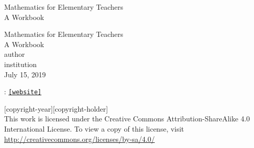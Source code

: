 \documentclass[twoside,11pt,]{book}
\newcommand{\mono}[1]{\texttt{#1}}
\begin{document}
\frontmatter
\thispagestyle{empty}
{\centering
\vspace*{0.28\textheight}
{\Huge Mathematics for Elementary Teachers}\\[2\baselineskip]
{\LARGE A Workbook}\\
}
\clearpage
\thispagestyle{empty}
\null%
\clearpage
\thispagestyle{empty}
{\centering
\vspace*{0.14\textheight}
{\Huge Mathematics for Elementary Teachers}\\[\baselineskip]
{\LARGE A Workbook}\\[3\baselineskip]
{\Large \textbraceleft{}author\textbraceright{}}\\[0.5\baselineskip]
{\Large \textbraceleft{}institution\textbraceright{}}\\[3\baselineskip]
{\Large July 15, 2019}\\}
\clearpage
\thispagestyle{empty}
\hypertarget{g:colophon:idm546717383952}{}
: \href{[website]}{\mono{[website]}}\par\medskip
\noindent\textcopyright{}[copyright-year]\quad{}[copyright-holder]\\[0.5\baselineskip]
 This work is licensed under the Creative Commons Attribution-ShareAlike 4.0 International License. To view a copy of this license, visit \href{http://creativecommons.org/licenses/by-sa/4.0/}{http:\slash{}\slash{}creativecommons.org\slash{}licenses\slash{}by-sa\slash{}4.0\slash{}}\par\medskip
{}
\null\clearpage
\setcounter{tocdepth}{2}
\renewcommand*\contentsname{Contents}
\tableofcontents
\mainmatter
%
%
\typeout{************************************************}
\typeout{************************************************}
%
\end{document}
